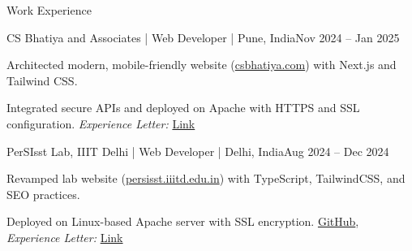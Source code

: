 \documentclass[10pt]{resume}
\begin{document}
\begin{rSection}{Work Experience}
\begin{rSubsection}{CS Bhatiya and Associates | Web Developer | Pune, India}{Nov 2024 -- Jan 2025}
    \item Architected modern, mobile-friendly website (\href{https://csbhatiya.com}{csbhatiya.com}) with Next.js and Tailwind CSS.
    \item Integrated secure APIs and deployed on Apache with HTTPS and SSL configuration. \textit{Experience Letter:} \href{https://drive.google.com/file/d/1ERZEwunqZLcGdk9Fz-A9g0KW0qIyfU5l/view?usp=sharing}{Link}
\end{rSubsection}

\begin{rSubsection}{PerSIsst Lab, IIIT Delhi | Web Developer | Delhi, India}{Aug 2024 -- Dec 2024}
    \item Revamped lab website (\href{https://persisst.iiitd.edu.in}{persisst.iiitd.edu.in}) with TypeScript, TailwindCSS, and SEO practices.
    \item Deployed on Linux-based Apache server with SSL encryption. \href{https://github.com/kintsugi-programmer/PerSIsst-Lab}{GitHub}, \textit{Experience Letter:} \href{https://drive.google.com/file/d/1uVUchMiUUwhLph9rYhSjSyHx-VntRaQw/view?usp=sharing}{Link}
\end{rSubsection}

\end{rSection}
\end{document}
